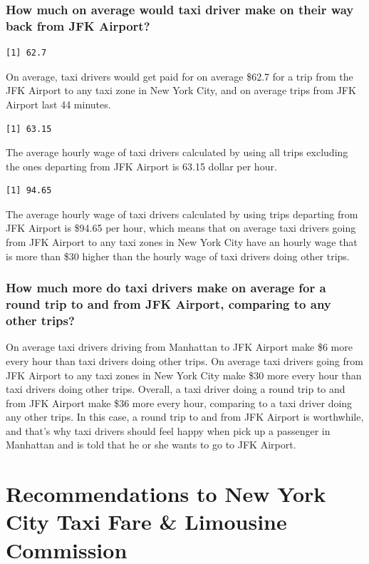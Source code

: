 \documentclass[12pt,twoside]{reedthesis}
\theoremstyle{definition}
\theoremstyle{definition}
\theoremstyle{definition}
\theoremstyle{remark}
\begin{document}
\subsubsection{How much on average would taxi driver make on their way
back from JFK
Airport?}\label{how-much-on-average-would-taxi-driver-make-on-their-way-back-from-jfk-airport-1}
\begin{verbatim}
[1] 62.7
\end{verbatim}
On average, taxi drivers would get paid for on average \$62.7 for a trip
from the JFK Airport to any taxi zone in New York City, and on average
trips from JFK Airport last 44 minutes.
\begin{verbatim}
[1] 63.15
\end{verbatim}
The average hourly wage of taxi drivers calculated by using all trips
excluding the ones departing from JFK Airport is 63.15 dollar per hour.
\begin{verbatim}
[1] 94.65
\end{verbatim}
The average hourly wage of taxi drivers calculated by using trips
departing from JFK Airport is \$94.65 per hour, which means that on
average taxi drivers going from JFK Airport to any taxi zones in New
York City have an hourly wage that is more than \$30 higher than the
hourly wage of taxi drivers doing other trips.

\subsubsection{How much more do taxi drivers make on average for a round
trip to and from JFK Airport, comparing to any other
trips?}\label{how-much-more-do-taxi-drivers-make-on-average-for-a-round-trip-to-and-from-jfk-airport-comparing-to-any-other-trips}

On average taxi drivers driving from Manhattan to JFK Airport make \$6
more every hour than taxi drivers doing other trips. On average taxi
drivers going from JFK Airport to any taxi zones in New York City make
\$30 more every hour than taxi drivers doing other trips. Overall, a
taxi driver doing a round trip to and from JFK Airport make \$36 more
every hour, comparing to a taxi driver doing any other trips. In this
case, a round trip to and from JFK Airport is worthwhile, and that's why
taxi drivers should feel happy when pick up a passenger in Manhattan and
is told that he or she wants to go to JFK Airport.

\section{Recommendations to New York City Taxi Fare \& Limousine
Commission}\label{recommendations-to-new-york-city-taxi-fare-limousine-commission}
\end{document}
